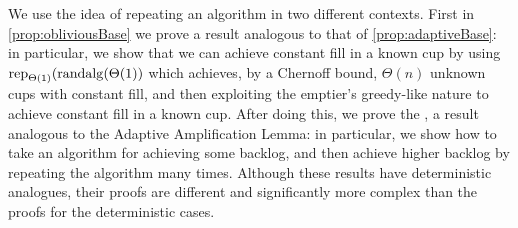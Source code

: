 We use the idea of repeating an algorithm in two different contexts.
First in \cref{prop:obliviousBase} we prove a result analogous to that of
\cref{prop:adaptiveBase}: in particular, we show that we can
achieve constant fill in a known cup by using
$\operatorname{\text{\textup{rep}}}_{\Theta(1)}(\operatorname{\text{\textup{randalg}}}(\Theta(1))$
which achieves, by a Chernoff bound, $\Theta(n)$ unknown cups
with constant fill, and then exploiting the emptier's greedy-like
nature to achieve constant fill in a known cup.
After doing this, we prove the , a result analogous to the Adaptive
Amplification Lemma: in particular, we show how to take an
algorithm for achieving some backlog, and then achieve higher
backlog by repeating the algorithm many times.
Although these results have deterministic analogues, their proofs
are different and significantly more complex than the proofs for the
deterministic cases.

